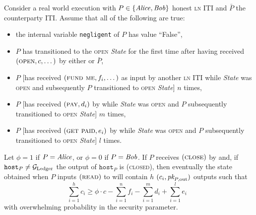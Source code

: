 \begin{lemma}
\label{lemma:real-balance-security}
  Consider a real world execution with $P \in \{\mathit{Alice}, \mathit{Bob}\}$ honest
  \textsc{ln} ITI and $\bar{P}$ the counterparty ITI. Assume that all of the
  following are true:
  \begin{itemize}
    \item the internal variable \texttt{negligent} of $P$ has value ``False'',
    \item $P$ has transitioned to the \textsc{open} \textit{State} for the first
    time after having received $(\textsc{open}, c, \dots)$ by either
    \environment or $\bar{P}$,
    \item $P$ [has received $(\textsc{fund me}, f_i, \dots)$ as input by another
    \textsc{ln} ITI while \textit{State} was \textsc{open} and subsequently $P$
    transitioned to \textsc{open} \textit{State}] $n$ times,
    \item $P$ [has received $(\textsc{pay}, d_i)$ by \environment while
    \textit{State} was \textsc{open} and $P$ subsequently transitioned to
    \textsc{open} \textit{State}] $m$ times,
    \item $P$ [has received $(\textsc{get paid}, e_i)$ by \environment while
    \textit{State} was \textsc{open} and $P$ subsequently transitioned to
    \textsc{open} \textit{State}] $l$ times.
  \end{itemize}
  Let $\phi = 1$ if $P = \mathit{Alice}$, or $\phi = 0$ if $P = \mathit{Bob}$. If $P$ receives
  $(\textsc{close})$ by \environment and, if $\texttt{host}_P \neq \mathcal{G}_{\mathrm{Ledger}}$
  the output of $\texttt{host}_P$ is (\textsc{closed}), then eventually the
  state obtained when $P$ inputs $(\textsc{read})$ to \ledger will contain $h$
  $(c_i, \textit{pk}_{P, \mathrm{out}})$ outputs such that
  \begin{equation}
  \label{lemma:real-balance-security:ineq}
    \sum\limits_{i=1}^h c_i \geq \phi \cdot c - \sum\limits_{i=1}^n f_i -
    \sum\limits_{i=1}^m d_i + \sum\limits_{i=1}^l e_i \enspace
  \end{equation}
  with overwhelming probability in the security parameter.
\end{lemma}


